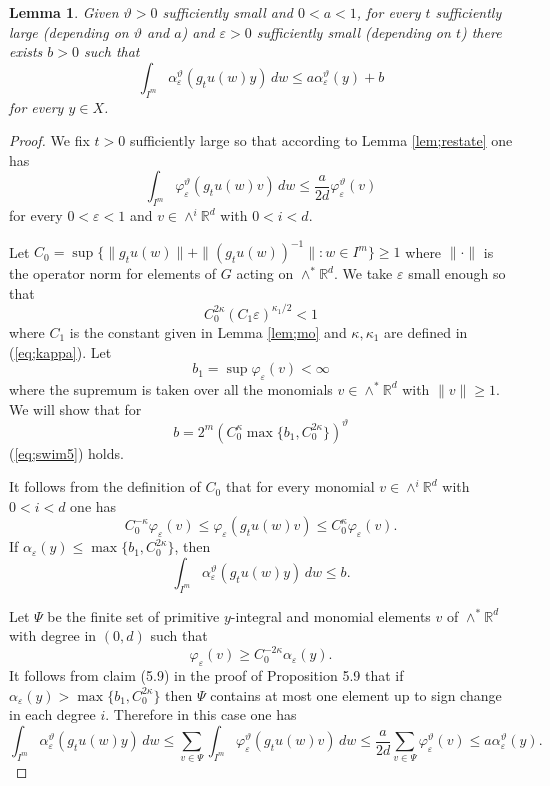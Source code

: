 \documentclass[12pt]{amsart}
\newtheorem{lem}[thm]{Lemma}
\theoremstyle{definition}
\theoremstyle{remark}
\numberwithin{equation}{section}
\begin{document}
\begin{lem}\label{lem;inequality}
Given  $\vartheta>0$ sufficiently small and  $0< a<1$, for every $t$ sufficiently large (depending on $\vartheta $ and $a$)
and 
 $\varepsilon >0$ sufficiently small (depending on $t$) there exists 
$b>0$ such that 
\begin{equation}\label{eq;swim5}
\int_{I^m} \alpha_{ \varepsilon }^{\vartheta}(g_tu(w)y) \,dw\le  a\alpha_{ \varepsilon }^\vartheta(y)+b
\end{equation}
for every $y\in X$.
\end{lem}
\begin{proof}
We fix $t>0$ sufficiently large so that   according to 
 Lemma \ref{lem;restate}  
one has
\[
\int_{I^m}\varphi^\vartheta_{\varepsilon}(g_tu(w)v)\, dw\le \frac{a}{2d}\varphi^\vartheta_{\varepsilon}(v)
\]
for every $0<\varepsilon<1$ and  $v\in \wedge^i\mathbb R^d$  with $0<i<d$.

Let $C_0=\sup\{\|g_tu(w)\|+\|(g_tu(w))^{-1}\|: w\in I^m\}\ge 1$
where $\|\cdot\|$ is the operator norm for elements of $G$ acting on $\wedge^*\mathbb R^d$.
We take $\varepsilon $ small enough so that 
\[
C_0^{2\kappa}(C_1\varepsilon)^{\kappa_1/2} <1
\]
where $C_1$ is the constant given in Lemma \ref{lem;mo} and $\kappa,\kappa_1$
are defined in (\ref{eq;kappa}).
Let 
\[
b_{1}=\sup \varphi_{\varepsilon }(v)<\infty
\]
where the supremum is taken over all the monomials $v\in\wedge^* \mathbb R^d$
with $\|v\|\ge 1$. We will show that for 
\[
b=2^m(C_0^{\kappa}\max\{b_1,C_0^{2\kappa}\})^\vartheta
\]
(\ref{eq;swim5}) holds.

 It follows from the definition of $C_0$ that  for every monomial
 $v\in \wedge^i\mathbb R^d$ with $0< i <d$ one has 
\[
C_0^{-\kappa}\varphi_{\varepsilon}(v)\le \varphi_{\varepsilon}(g_tu(w)v)\le C_0^{\kappa} \varphi_{\varepsilon}(v).
\]
If $\alpha_{ \varepsilon }(y)\le \max\{b_1, C_0^{2\kappa}\}$, then
\[
\int_{I^m} \alpha_{ \varepsilon }^\vartheta(g_tu(w)y)\, dw\le b.
\]

Let $\Psi$ be the finite set of primitive $y$-integral and monomial elements $v$ 
of $\wedge^*\mathbb R^d$ with degree in $(0,d)$ such that 
\[
\varphi_{ \varepsilon }(v)\ge C_0^{-2\kappa} \alpha_{\varepsilon}(y).
\]
It follows from
claim (5.9) 
 in the  proof of \cite{bq12} Proposition 5.9  that
 if  $\alpha_{ \varepsilon }(y)>\max\{b_1, C_0^{2\kappa}\}$ 
 then 
 $\Psi$ contains at most one element up to sign change in each degree $i$. 
Therefore
in this case one has
\[
\int_{I^m} \alpha_{ \varepsilon }^\vartheta(g_tu(w)y) \,dw\le \sum _{v\in \Psi}
\int_{I^m} \varphi_{ \varepsilon }^\vartheta(g_tu(w)v)\, dw\le 
\frac{a}{2d}\sum _{v\in \Psi} \varphi_{ \varepsilon }^\vartheta(v)\le a  \alpha_{ \varepsilon }^\vartheta(y). 
\]
\end{proof}
\end{document}
